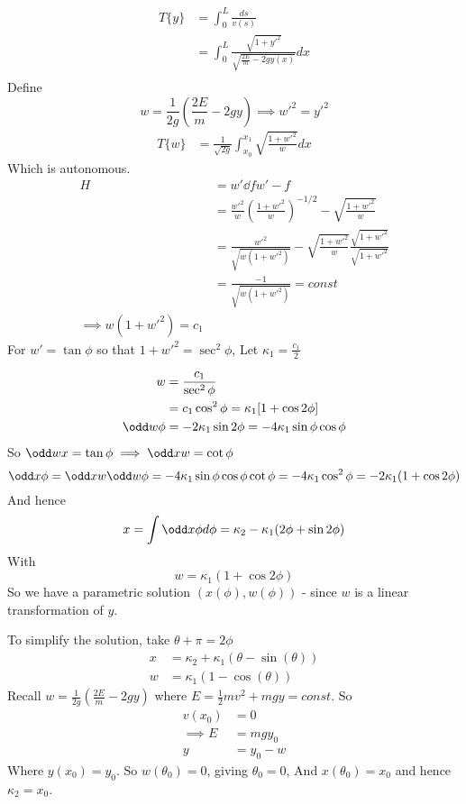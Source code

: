 \documentclass{X:/Documents/Coding/Latex/myassignment}
\begin{document}
\begin{align*}
	T\{y\} &= \int_0^L \frac{ds}{v(s)}\\
	&= \int_0^L \frac{\sqrt{1+y'^2}}{\sqrt{\frac{2E}{m} - 2gy(x)}}dx\\
\end{align*}
Define
\[w = \frac1{2g} \left(\frac{2E}{m} - 2gy\right) \implies w'^2 = y'^2\]
\begin{align*}
	T\{w\} &= \frac{1}{\sqrt{2g}}\int_{x_0}^{x_1} \sqrt{\frac{1+w'^2}{w}} dx
\end{align*}
Which is autonomous. 
\begin{align*}
	H &= w' \dd f{w'} - f \\
	&= \frac{w'^2}{w}\left(\frac{1+w'^2}{w}\right)^{-1/2}  -\sqrt{\frac{1+w'^2}{w}}\\
	&= \frac{w'^2}{\sqrt{w(1+w'^2)}} - \sqrt{\frac{1+w'^2}{w}} \frac{\sqrt{1+w'^2}}{\sqrt{1+w'^2}}\\
	&= \frac{-1}{\sqrt{w(1+w'^2)}} = const\\
	\implies w(1+w'^2) = c_1
\end{align*}
For $w' = \tan \phi$ so that $1+w'^2 = \sec^2\phi$, Let $\kappa_1 = \frac{c_1}{2}$

\begin{align*}
	w &= \frac{c_1}{\sec^2\phi}\\
	  &= c_1 \cos^2 \phi = \kappa_1 [1+\cos 2\phi]\\
	\odd w \phi &=	-2 \kappa_1 \sin 2\phi = -4 \kappa_1 \sin\phi \cos \phi
\end{align*}
So $\odd w x = \tan \phi \implies \odd xw = \cot \phi$
\[\odd x \phi = \odd x w\odd w \phi = -4 \kappa_1 \sin \phi \cos \phi \cot \phi = -4 \kappa_1 \cos^2 \phi = -2 \kappa_1 (1+ \cos 2\phi)\]
And hence
\[x = \int \odd x \phi d \phi = \kappa_2 - \kappa_1 (2\phi + \sin 2\phi)\]
With
\[w = \kappa_1 (1+\cos 2\phi)\] 
So we have a parametric solution $(x(\phi), w(\phi))$ - since $w$ is a linear transformation of $y$.

To simplify the solution, take $\theta + \pi = 2\phi$
\begin{align*}
	x &= \kappa_2 + \kappa_1(\theta - \sin(\theta))\\
	w &= \kappa_1 (1-\cos(\theta))
\end{align*}
Recall $w = \frac{1}{2g} (\frac{2E}{m} - 2gy)$ where $E = \frac12 mv^2 + mgy = const$. So
\begin{align*}
	v(x_0) &= 0\\
	\implies E &= mgy_0\\
	y &= y_0 -w
\end{align*}
Where $y(x_0) = y_0$. So $w(\theta_0) = 0$, giving $\theta_0 = 0$, And $x(\theta_0) = x_0$ and hence $\kappa_2 = x_0$.
\end{document}
